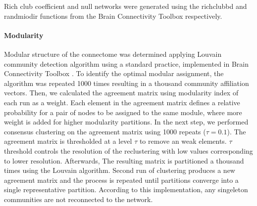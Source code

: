 \documentclass[10pt,letterpaper]{article}
\begin{document}
Rich club coefficient and null networks were generated using the rich\textunderscore club\textunderscore bd and randmio\textunderscore dir functions from the Brain Connectivity Toolbox \cite{Rubinov2010} respectively.


\paragraph{Modularity}
Modular structure of the connectome was determined applying Louvain community detection algorithm using a standard practice, implemented in Brain Connectivity Toolbox \cite{Rubinov2010}.
To identify the optimal modular assignment, the algorithm was repeated 1000 times resulting in a thousand community affiliation vectors.
Then, we calculated the agreement matrix using modularity index of each run as a weight.
Each element in the agreement matrix defines a relative probability for a pair of nodes to be assigned to the same module, where more weight is added for higher modularity partitions.
In the next step, we performed consensus clustering on the agreement matrix using 1000 repeats ($\tau=0.1$).
The agreement matrix is thresholded at a level $\tau$ to remove an weak elements.
$\tau$ threshold controls the resolution of the reclustering with low values corresponding to lower resolution.
Afterwards, The resulting matrix is partitioned a thousand times using the Louvain algorithm.
Second run of clustering produces a new agreement matrix and the process is repeated until partitions converge into a single representative partition.
According to this implementation, any singeleton communities are not reconnected to the network.


\end{document}
